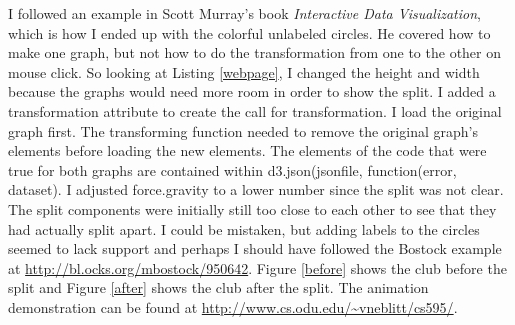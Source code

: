 \documentclass{article}
\begin{document}
I followed an example in Scott Murray's book \emph {Interactive Data Visualization}, which is how I ended up with the colorful unlabeled circles. He covered how to make one graph, but not how to do the transformation from one to the other on mouse click. So looking at Listing \ref{webpage}, I changed the height and width because the graphs would need more room in order to show the split. I added a transformation attribute to create the call for transformation. I load the original graph first. The transforming function needed to remove the original graph's elements before loading the new elements. The elements of the code that were true for both graphs are contained within d3.json(jsonfile, function(error, dataset). I adjusted force.gravity to a lower number since the split was not clear. The split components were initially still too close to each other to see that they had actually split apart. I could be mistaken, but adding labels to the circles seemed to lack support and perhaps I should have followed the Bostock example at \url{http://bl.ocks.org/mbostock/950642}. Figure \ref{before} shows the club before the split and Figure \ref{after} shows the club after the split. The animation demonstration can be found at \url{http://www.cs.odu.edu/~vneblitt/cs595/}.
\end{document}
